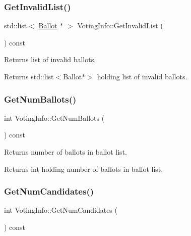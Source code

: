 \subsubsection{\texorpdfstring{Get\+Invalid\+List()}{GetInvalidList()}}
{\footnotesize\ttfamily std\+::list$<$ \hyperlink{classBallot}{Ballot} $\ast$ $>$ Voting\+Info\+::\+Get\+Invalid\+List (\begin{DoxyParamCaption}{ }\end{DoxyParamCaption}) const}



Returns list of invalid ballots. 

\begin{DoxyReturn}{Returns}
std\+::list$<$\+Ballot$\ast$$>$ holding list of invalid ballots. 
\end{DoxyReturn}
\mbox{\label{classVotingInfo_af84ccfdfbdf95bc33f959d8b82e27d8c}} 
\subsubsection{\texorpdfstring{Get\+Num\+Ballots()}{GetNumBallots()}}
{\footnotesize\ttfamily int Voting\+Info\+::\+Get\+Num\+Ballots (\begin{DoxyParamCaption}{ }\end{DoxyParamCaption}) const}



Returns number of ballots in ballot list. 

\begin{DoxyReturn}{Returns}
int holding number of ballots in ballot list. 
\end{DoxyReturn}
\mbox{\label{classVotingInfo_add7749e53650135da703aa7b816598f5}} 
\subsubsection{\texorpdfstring{Get\+Num\+Candidates()}{GetNumCandidates()}}
{\footnotesize\ttfamily int Voting\+Info\+::\+Get\+Num\+Candidates (\begin{DoxyParamCaption}{ }\end{DoxyParamCaption}) const}



